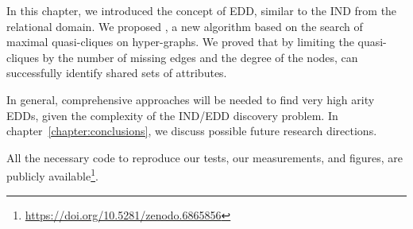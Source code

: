 In this chapter, we introduced the concept of EDD, similar to the \gls{IND} from
the relational domain. We proposed \PresQ, a new algorithm based on the search of
maximal quasi-cliques on hyper-graphs. We proved that by limiting the quasi-cliques
by the number of missing edges and the degree of the nodes, \PresQ can successfully
identify shared sets of attributes.

In general, comprehensive approaches will be needed to find very high arity \glspl{EDD},
given the complexity of the \gls{IND}/\gls{EDD} discovery problem.
In chapter~\ref{chapter:conclusions}, we discuss possible future research directions.

All the necessary code to reproduce our tests, our
measurements, and figures, are publicly available\footnote{\url{https://doi.org/10.5281/zenodo.6865856}}.
